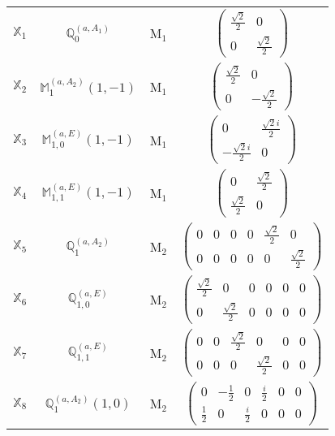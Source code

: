 \documentclass[fleqn,10pt,landscape]{article}
\begin{document}
\begin{itemize}
\begin{center}
\begin{longtable}{c|c|c|c}
$ \mathbb{X}_{1} $ & $\mathbb{Q}_{0}^{(a,A_{1})}$ & M$_{1}$ & $\begin{pmatrix} \frac{\sqrt{2}}{2} & 0 \\ 0 & \frac{\sqrt{2}}{2} \end{pmatrix}$ \\
$ \mathbb{X}_{2} $ & $\mathbb{M}_{1}^{(a,A_{2})}(1,-1)$ & M$_{1}$ & $\begin{pmatrix} \frac{\sqrt{2}}{2} & 0 \\ 0 & - \frac{\sqrt{2}}{2} \end{pmatrix}$ \\
$ \mathbb{X}_{3} $ & $\mathbb{M}_{1,0}^{(a,E)}(1,-1)$ & M$_{1}$ & $\begin{pmatrix} 0 & \frac{\sqrt{2} i}{2} \\ - \frac{\sqrt{2} i}{2} & 0 \end{pmatrix}$ \\
$ \mathbb{X}_{4} $ & $\mathbb{M}_{1,1}^{(a,E)}(1,-1)$ & M$_{1}$ & $\begin{pmatrix} 0 & \frac{\sqrt{2}}{2} \\ \frac{\sqrt{2}}{2} & 0 \end{pmatrix}$ \\ \hline
$ \mathbb{X}_{5} $ & $\mathbb{Q}_{1}^{(a,A_{2})}$ & M$_{2}$ & $\begin{pmatrix} 0 & 0 & 0 & 0 & \frac{\sqrt{2}}{2} & 0 \\ 0 & 0 & 0 & 0 & 0 & \frac{\sqrt{2}}{2} \end{pmatrix}$ \\
$ \mathbb{X}_{6} $ & $\mathbb{Q}_{1,0}^{(a,E)}$ & M$_{2}$ & $\begin{pmatrix} \frac{\sqrt{2}}{2} & 0 & 0 & 0 & 0 & 0 \\ 0 & \frac{\sqrt{2}}{2} & 0 & 0 & 0 & 0 \end{pmatrix}$ \\
$ \mathbb{X}_{7} $ & $\mathbb{Q}_{1,1}^{(a,E)}$ & M$_{2}$ & $\begin{pmatrix} 0 & 0 & \frac{\sqrt{2}}{2} & 0 & 0 & 0 \\ 0 & 0 & 0 & \frac{\sqrt{2}}{2} & 0 & 0 \end{pmatrix}$ \\
$ \mathbb{X}_{8} $ & $\mathbb{Q}_{1}^{(a,A_{2})}(1,0)$ & M$_{2}$ & $\begin{pmatrix} 0 & - \frac{1}{2} & 0 & \frac{i}{2} & 0 & 0 \\ \frac{1}{2} & 0 & \frac{i}{2} & 0 & 0 & 0 \end{pmatrix}$ \\

\end{longtable}
\end{center}
\end{itemize}
\end{document}

